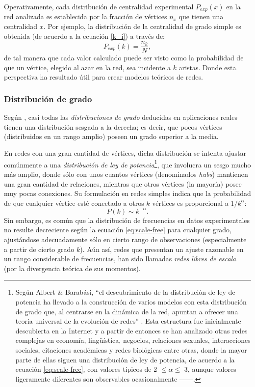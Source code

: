 \documentclass[letterpaper, 11pt]{book}
\theoremstyle{definition}
\theoremstyle{remark}
\begin{document}
Operativamente, cada distribución de centralidad experimental $P_{exp}(x)$ en la red analizada es establecida por la fracción de vértices $n_{x}$ que tienen una centralidad $x$. 
Por ejemplo, la distribución de la centralidad de grado simple es obtenida (de acuerdo a la ecuación \ref{k_i}) a través de:
\begin{equation}\label{eq:distribucion_grado}
    P_{exp}(k) = \frac{n_{k}}{N}, 
\end{equation}
de tal manera que cada valor calculado puede ser visto como la probabilidad de que un vértice, elegido al azar en la red, sea incidente a $k$ aristas. 
Donde esta perspectiva ha resultado útil para crear modelos teóricos de redes. 


\subsubsection{Distribución de grado}
\label{subsubsec:Distribuciob_grado}
Según \citet{2010_Newman_Networks}, casi todas las \emph{distribuciones de grado} deducidas en aplicaciones reales tienen una distribución sesgada a la derecha; es decir, que pocos vértices (distribuidos en un rango amplio) poseen un grado superior a la media. 


En redes con una gran cantidad de vértices, dicha distribución se intenta ajustar comúnmente a una \emph{distribución de ley de potencia}\footnote{
    Según Albert \& Barabási, ``el descubrimiento de la distribución de ley de potencia ha llevado a la construcción de varios modelos con esta distribución de grado que, al centrarse en la dinámica de la red, apuntan a ofrecer una teoría universal de la evolución de redes'' \citep[49]{2002_Barabasi_MechanicsOfComplexNetworks}. 
    Esta estructura fue inicialmente descubierta en la Internet y a partir de entonces se han analizado otras redes complejas en economía, lingüística, negocios, relaciones sexuales, interacciones sociales, citaciones académicas y redes biológicas entre otras, donde la mayor parte de ellas siguen una distribución de ley de potencia, de acuerdo a la ecuación \ref{eq:scale-free}, con valores típicos de 2 $\leq \alpha \leq$ 3, aunque valores ligeramente diferentes son observables ocasionalmente ---\citet{2010_Newman_Networks}---.
}, 
que involucra un sesgo mucho más amplio, donde sólo con unos cuantos vértices (denominados \emph{hubs}) mantienen una gran cantidad de relaciones, mientras que otros vértices (la mayoría) posee muy pocas conexiones. 
Su formulación en redes simples indica que la probabilidad de que cualquier vértice esté conectado a otros $k$ vértices es proporcional a $1/k^{\alpha}$: 
\begin{equation}\label{eq:scale-free}
    P(k) \sim k^{-\alpha}.
\end{equation}
Sin embargo, es común que la distribución de frecuencias en datos experimentales no resulte decreciente según la ecuación \ref{eq:scale-free} para cualquier grado, ajustándose adecuadamente sólo en cierto rango de observaciones (especialmente a partir de cierto grado $k$). 
Aún así, redes que presentan un ajuste razonable en un rango considerable de frecuencias, han sido llamadas \emph{redes libres de escala} (por la divergencia teórica de sus momentos). 
\end{document}
